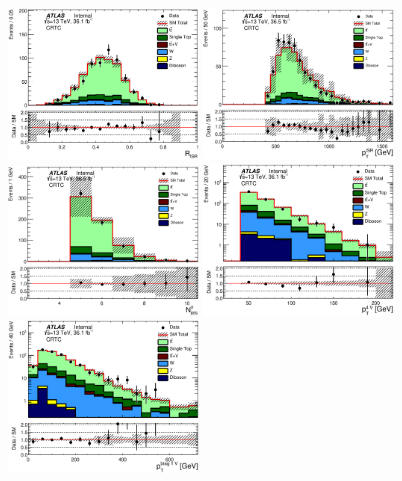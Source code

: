 \begin{figure}[htbp]
  \begin{center}
    \includegraphics[width=0.45\textwidth]{figures/ttbar/postfit/CA_RISR_CRTopC}
    \includegraphics[width=0.45\textwidth]{figures/ttbar/postfit/CA_pTISR_CRTopC}
    \includegraphics[width=0.45\textwidth]{figures/ttbar/postfit/CA_NjV_CRTopC}
    \includegraphics[width=0.45\textwidth]{figures/ttbar/postfit/CA_pTjV4_CRTopC_log}
    \includegraphics[width=0.45\textwidth]{figures/ttbar/postfit/CA_pTbV1_CRTopC_log}

\end{center}
\end{figure}

